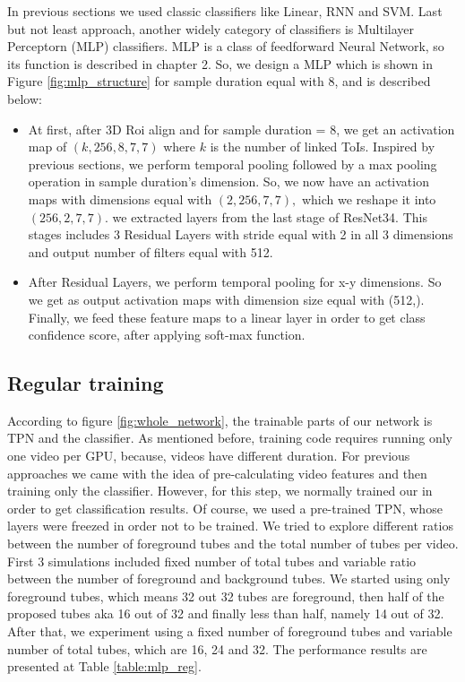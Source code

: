 In previous sections we used classic classifiers like Linear, RNN and SVM. Last but not least approach,
another widely category of classifiers  is Multilayer Perceptorn (MLP) classifiers. MLP is a class of
feedforward Neural Network, so its function is described in chapter 2.
So, we design a MLP which is shown in Figure \ref{fig:mlp_structure} for sample duration equal with 8, and is described below:
\begin{itemize}
\item At first,  after 3D Roi align and for sample duration = 8, we get an activation map of $(k,256,8,7,7)$ where $k$ is the
  number of linked ToIs. Inspired by previous sections, we perform temporal pooling followed by a max pooling operation in
  sample duration's dimension. So, we now have an activation maps with dimensions equal with $(2,256,7,7),$ which we reshape
  it into $(256,2,7,7).$ 
 we extracted layers from the last stage of ResNet34. This stages includes 3 Residual Layers
  with stride equal with 2 in all 3 dimensions and output number of filters equal with 512.

\item After Residual Layers, we perform temporal pooling for x-y dimensions. So we get as output activation maps with dimension size
  equal with (512,).  Finally, we feed these feature maps to a linear layer in order to get class confidence score, after applying
  soft-max function.

\end{itemize}

\subsection{Regular training}
According to figure \ref{fig:whole_network}, the trainable parts of our network is TPN and the classifier.
As mentioned before, training code requires running only one video per GPU, because, videos have different duration. For previous approaches
we came with the idea of pre-calculating video features and then training only the classifier. However, for this step, we normally trained our
in order to get classification results. Of course, we used a pre-trained TPN, whose layers were freezed in order not to be trained.
We tried to explore different ratios between the number of foreground tubes and the total number of tubes per video. First 3 simulations included
fixed number of total tubes and variable ratio between the number of foreground and background tubes. We started using only foreground tubes, which
means 32 out 32 tubes are foreground, then half of the proposed tubes aka 16 out of 32 and finally less than half, namely 14 out of 32. After that,
we experiment using a fixed number of foreground tubes and variable number of total tubes, which are 16, 24 and 32. The performance results are presented
at Table \ref{table:mlp_reg}.

